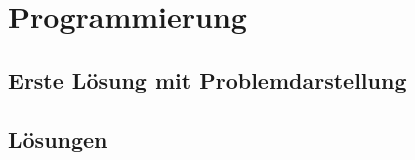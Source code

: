 \chapter{Programmierung}
\label{programmierung}

\section{Erste Lösung mit Problemdarstellung}
\label{erste_lösung}

\section{Lösungen}
\label{endlösung}